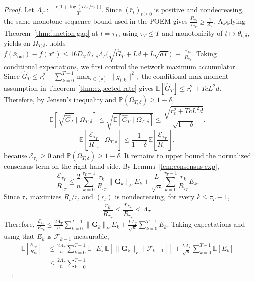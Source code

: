 \documentclass[runningheads]{llncs}
\newcommand{\Prob}{\mathbb{P}}
\begin{document}
\begin{proof}
Let
\(
\Lambda_T:=\frac{e\bigl(1+\log(D_{\mathcal{X}}/r_\epsilon)\bigr)}{T}.
\)
Since \((\bar r_t)_{t\ge 0}\) is positive and nondecreasing,
the same monotone-sequence bound used in the  POEM  gives
\(
\frac{R_{\tau_T}}{\bar r_{\tau_T}}
\ge
\frac{1}{\Lambda_T}.
\)
Applying Theorem~\ref{thm:function-gap} at \(t=\tau_T\), using
\(\tau_T\le T\) and monotonicity of \(t\mapsto \theta_{t,\delta}\), yields on
\(\Omega_{T,\delta}\), holds
\(
f(\bar x_{\mathrm{out}})-f(x^\star)
\le
16D_{\mathcal{X}}\theta_{T,\delta}\Lambda_T
\bigl(\sqrt{\hat G_{T}}+Ld+L\sqrt{dT}\bigr)
\;+\;
\frac{\mathcal E_{\tau_T}}{R_{\tau_T}}.
\)
Taking conditional expectations, we first control the network maximum
accumulator. Since
\(
\hat G_T
\le
r_\epsilon^2+\sum_{k=0}^{T-1}\max_{i\in[n]}\|g_{i,k}\|^2,
\)
the conditional max-moment assumption in Theorem~\ref{thm:expected-rate} gives
\(
\mathbb E[\hat G_T]
\le
r_\epsilon^2+TcL^2d.
\)
Therefore, by Jensen's inequality and \(\Prob(\Omega_{T,\delta})\ge 1-\delta\),
\[
\mathbb E[\sqrt{\hat G_{T}}\mid \Omega_{T,\delta}]
\le
\sqrt{\mathbb E[\hat G_T\mid \Omega_{T,\delta}]}
\le
\frac{\sqrt{r_\epsilon^2+TcL^2d}}{\sqrt{1-\delta}}.
\]
\[
\mathbb E\!\left[\frac{\mathcal E_{\tau_T}}{R_{\tau_T}}\middle|\Omega_{T,\delta}\right]
\le
\frac{1}{1-\delta}\,
\mathbb E\!\left[\frac{\mathcal E_{\tau_T}}{R_{\tau_T}}\right],
\]
because \(\mathcal E_{\tau_T}\ge 0\) and \(\Prob(\Omega_{T,\delta})\ge 1-\delta\).
It remains to upper bound the normalized consensus term on the right-hand side.
By Lemma~\ref{lem:consensus-exp},
\[
\frac{\mathcal E_{\tau_T}}{R_{\tau_T}}
\le
\frac{2}{n}\sum_{k=0}^{\tau_T-1}\frac{\bar r_k}{R_{\tau_T}}\|\mathbf G_k\|_F E_k
+
\frac{L}{\sqrt n}\sum_{k=0}^{\tau_T-1}\frac{\bar r_k}{R_{\tau_T}}E_k.
\]
Since \(\tau_T\) maximizes \(R_t/\bar r_t\) and \((\bar r_t)\) is nondecreasing,
for every \(k\le \tau_T-1\),
\[
\frac{\bar r_k}{R_{\tau_T}}
\le
\frac{\bar r_{\tau_T}}{R_{\tau_T}}
\le
\Lambda_T.
\]
Therefore,
\(
\frac{\mathcal E_{\tau_T}}{R_{\tau_T}}
\le
\frac{2\Lambda_T}{n}\sum_{k=0}^{T-1}\|\mathbf G_k\|_F E_k
+
\frac{L\Lambda_T}{\sqrt n}\sum_{k=0}^{T-1}E_k.
\)
Taking expectations and using that \(E_k\) is \(\mathcal F_{k-1}\)-measurable,
\begin{align*}
\mathbb E\!\left[\frac{\mathcal E_{\tau_T}}{R_{\tau_T}}\right]
&\le
\frac{2\Lambda_T}{n}\sum_{k=0}^{T-1}
\mathbb E\!\left[E_k\,\mathbb E[\|\mathbf G_k\|_F\mid \mathcal F_{k-1}]\right]
+
\frac{L\Lambda_T}{\sqrt n}\sum_{k=0}^{T-1}\mathbb E[E_k] \\
&\le
\frac{2\Lambda_T}{n}\sum_{k=0}^{T-1}

\end{align*}
\end{proof}
\end{document}
